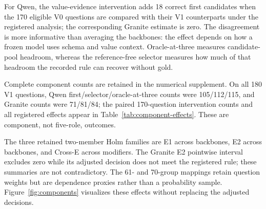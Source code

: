 \documentclass[applsci,article,submit,moreauthors]{Definitions/mdpi}
\begin{document}
For Qwen, the value-evidence intervention adds 18 correct first candidates when the 170 eligible V0 questions are compared with their V1 counterparts under the registered analysis; the corresponding Granite estimate is zero. The disagreement is more informative than averaging the backbones: the effect depends on how a frozen model uses schema and value context. Oracle-at-three measures candidate-pool headroom, whereas the reference-free selector measures how much of that headroom the recorded rule can recover without gold.

Complete component counts are retained in the numerical supplement. On all 180 V1 questions, Qwen first/selector/oracle-at-three counts were 105/112/115, and Granite counts were 71/81/84; the paired 170-question intervention counts and all registered effects appear in Table~\ref{tab:component-effects}. These are component, not five-role, outcomes.

\begin{table}[htbp]
\caption{Complete component-effect families. Intervals are pointwise group-composition sensitivity summaries, not simultaneous intervals and not inversions of the Holm tests. Each family contains the two displayed members indicated by its identifier.}
\label{tab:component-effects}\centering\scriptsize
{}
\end{table}

The three retained two-member Holm families are E1 across backbones, E2 across backbones, and Cross-E across modifiers. The Granite E2 pointwise interval excludes zero while its adjusted decision does not meet the registered rule; these summaries are not contradictory. The 61- and 70-group mappings retain question weights but are dependence proxies rather than a probability sample. Figure~\ref{fig:components} visualizes these effects without replacing the adjusted decisions.
\end{document}
